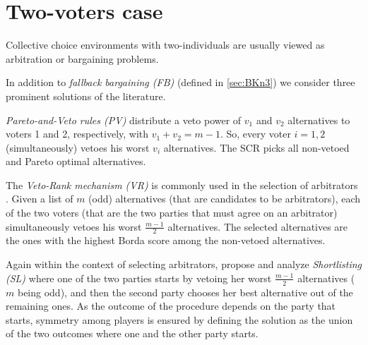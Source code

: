 \documentclass[version=3.21, pagesize, twoside=off, bibliography=totoc, DIV=calc, fontsize=12pt, a4paper]{scrartcl}
\begin{document}
 

\section{Two-voters case}
Collective choice environments with two-individuals are usually viewed as arbitration or bargaining problems.  


In addition to \textit{fallback bargaining (FB)} \citep{Brams2001} (defined in \cref{sec:BKn3}) we consider three prominent solutions of the literature.

\textit{Pareto-and-Veto rules (PV)} \citep{Laslier2020} distribute a veto power of $v_1$ and $v_2$ alternatives to voters 1 and 2, respectively, with $v_1+v_2=m-1$. So, every voter $i=1,2$ (simultaneously) vetoes his worst $v_i$ alternatives. The \ac{SCR} picks all non-vetoed and Pareto optimal alternatives.

The \textit{Veto-Rank mechanism (VR)} is commonly used in the selection of arbitrators \citep{Clippel2014}. Given a list of $m$ (odd) alternatives (that are candidates to be arbitrators), each of the two voters (that are the two parties that must agree on an arbitrator) simultaneously vetoes his worst $\frac{m-1}{2}$ alternatives. The selected alternatives are the ones with the highest Borda score among the non-vetoed alternatives.

Again within the context of selecting arbitrators, \citet{Clippel2014} propose and analyze \textit{Shortlisting (SL)} where one of the two parties starts by vetoing her worst $\frac{m-1}{2}$ alternatives ($m$ being odd), and then the second party chooses her best alternative out of the remaining ones. As the outcome of the procedure depends on the party that starts, symmetry among players is ensured by defining the solution as the union of the two outcomes where one and the other party starts.
\end{document}
